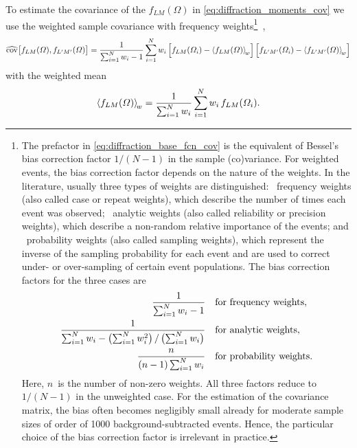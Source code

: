 To estimate the covariance of the $f_{L M}(\Omega)$ in
\cref{eq:diffraction_moments_cov} we use the weighted sample
covariance with frequency weights\footnote{The prefactor in
\cref{eq:diffraction_base_fcn_cov} is the equivalent of Bessel's bias
correction factor $1 / (N - 1)$ in the sample (co)variance.  For
weighted events, the bias correction factor depends on the nature of
the weights.  In the literature, usually three types of weights are
distinguished: \one~frequency weights (also called case or repeat
weights), which describe the number of times each event was observed;
\two~analytic weights (also called reliability or precision weights),
which describe a non-random relative importance of the events; and
\three~probability weights (also called sampling weights), which
represent the inverse of the sampling probability for each event and
are used to correct under- or over-sampling of certain event
populations.  The bias correction factors for the three cases are
\begin{align}
  \frac{1}{\sum_{i = 1}^N w_i - 1} & \quad\text{for frequency weights},
  \\
  \frac{1}{\sum_{i = 1}^N w_i - \rBrk[1]{\sum_{i = 1}^N w_i^2} / \rBrk[1]{\sum_{i = 1}^N w_i}} & \quad\text{for analytic weights},
  \\
  \frac{n}{(n - 1) \sum_{i = 1}^N w_i} & \quad\text{for probability weights}.
\end{align}
Here, $n$~is the number of non-zero weights.  All three factors reduce
to $1 / (N - 1)$ in the unweighted case.  For the estimation of the
covariance matrix, the bias often becomes negligibly small already for
moderate sample sizes of order of \num{1000} background-subtracted
events.  Hence, the particular choice of the bias correction factor is
irrelevant in practice.}~\cite{wikipedia:WeightedArithmeticMean},
\ie
\begin{equation}
  \label{eq:diffraction_base_fcn_cov}
  \covEst[1]{f_{L M}(\Omega), f_{L' M'}(\Omega)}
  = \frac{1}{\sum_{i = 1}^N w_i - 1} \sum_{i = 1}^N w_i
  \sBrk[2]{f_{L M}(\Omega_i) - \meanWeighted{f_{L M}(\Omega)}} \sBrk[2]{f_{L' M'}(\Omega_i) - \meanWeighted{f_{L' M'}(\Omega)}}
\end{equation}
with the weighted mean
\begin{equation}
  \meanWeighted{f_{L M}(\Omega)}
  = \frac{1}{\sum_{i = 1}^N w_i} \sum_{i = 1}^N w_i\, f_{L M}(\Omega_i).
\end{equation}

